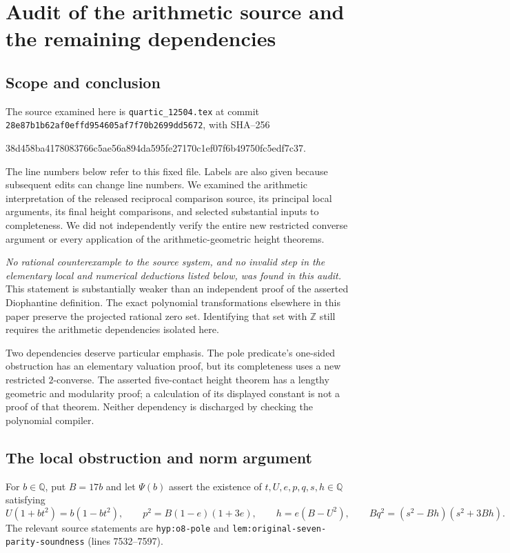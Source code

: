 \documentclass[11pt]{article}
\theoremstyle{definition}
\begin{document}
\section{Audit of the arithmetic source and the remaining dependencies}
\label{sec:arithmetic-source-audit}

\subsection{Scope and conclusion}

The source examined here is \texttt{quartic\_12504.tex} at commit
\nolinkurl{28e87b1b62af0effd954605af7f70b2699dd5672}, with SHA--256
\begin{center}\footnotesize\ttfamily
38d458ba4178083766c5ae56a894da595fe27170c1ef07f6b49750fc5edf7c37.
\end{center}
The line numbers below refer to this fixed file.  Labels are also given
because subsequent edits can change line numbers.  We examined the
arithmetic interpretation of the released reciprocal comparison source,
its principal local arguments, its final height comparisons, and selected
substantial inputs to completeness.  We did not independently verify the
entire new restricted converse argument or every application of the
arithmetic-geometric height theorems.

\emph{No rational counterexample to the source system, and no invalid
step in the elementary local and numerical deductions listed below, was
found in this audit.}  This statement is substantially weaker than an
independent proof of the asserted Diophantine definition.  The exact
polynomial transformations elsewhere in this paper preserve the projected
rational zero set.  Identifying that set with $\mathbb Z$ still requires
the arithmetic dependencies isolated here.

Two dependencies deserve particular emphasis.  The pole predicate's
one-sided obstruction has an elementary valuation proof, but its
completeness uses a new restricted $2$-converse.  The asserted
five-contact height theorem has a lengthy geometric and modularity proof;
a calculation of its displayed constant is not a proof of that theorem.
Neither dependency is discharged by checking the polynomial compiler.

\subsection{The local obstruction and norm argument}

For $b\in\mathbb Q$, put $B=17b$ and let $\Psi(b)$ assert the existence
of $t,U,e,p,q,s,h\in\mathbb Q$ satisfying
\[
 U(1+bt^2)=b(1-bt^2),\qquad p^2=B(1-e)(1+3e),\qquad
 h=e(B-U^2),\qquad Bq^2=(s^2-Bh)(s^2+3Bh).
\]
The relevant source statements are
\texttt{hyp:o8-pole} and \nolinkurl{lem:original-seven-parity-soundness}
(lines 7532--7597).
\end{document}
